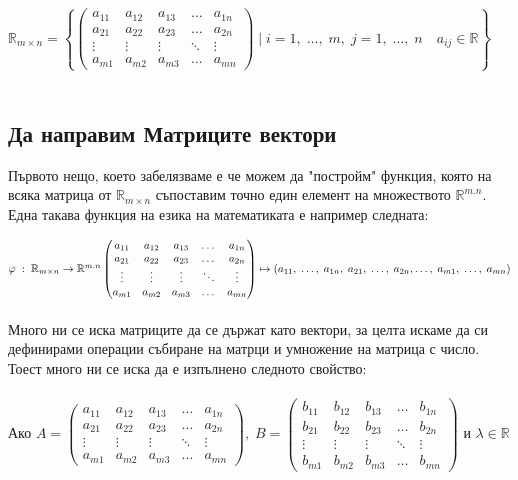 \documentclass[12pt]{article}
\newcommand{\R}{\mathbb{R}}
\begin{document}
$ \R_{m \times n} = \left\{
    \begin{pmatrix}
        a_{11} & a_{12} & a_{13} & \dots  & a_{1n} \\
        a_{21} & a_{22} & a_{23} & \dots  & a_{2n} \\
        \vdots & \vdots & \vdots & \ddots & \vdots \\
        a_{m1} & a_{m2} & a_{m3} & \dots  & a_{mn}
    \end{pmatrix} \; \Bigg| \; i = 1, \; \dots, \; m, \; j = 1, \; \dots, \; n \quad a_{ij} \in \R
\right\} $ \\\\

\subsection*{Да направим Матриците вектори}

Първото нещо, което забелязваме е че можем да "постройм" функция, която на всяка матрица от $\R_{m \times n}$ съпоставим точно един
елемент на множеството $\R^{m.n}$. Една такава функция на езика на математиката е например следната: \pagebreak

$
    \varphi \; : \; \R_{m \times n} \to \R^{m.n} \\\\
    \begin{pmatrix}
        a_{11} & a_{12} & a_{13} & \dots  & a_{1n} \\
        a_{21} & a_{22} & a_{23} & \dots  & a_{2n} \\
        \vdots & \vdots & \vdots & \ddots & \vdots \\
        a_{m1} & a_{m2} & a_{m3} & \dots  & a_{mn}
    \end{pmatrix} \mapsto (a_{11}, \; \dots, \; a_{1n}, \; a_{21}, \; \dots, \; a_{2n}, \dots, \; a_{m1}, \;  \dots, \; a_{mn})
$ \\\\

Много ни се иска матриците да се държат като вектори, за целта искаме да си дефинирами операции събиране на матрци и умножение на матрица с число.
Тоест много ни се иска да е изпълнено следното свойство: \\\\

Ако $A = \begin{pmatrix}
    a_{11} & a_{12} & a_{13} & \dots  & a_{1n} \\
    a_{21} & a_{22} & a_{23} & \dots  & a_{2n} \\
    \vdots & \vdots & \vdots & \ddots & \vdots \\
    a_{m1} & a_{m2} & a_{m3} & \dots  & a_{mn}
\end{pmatrix}, \; B = \begin{pmatrix}
    b_{11} & b_{12} & b_{13} & \dots  & b_{1n} \\
    b_{21} & b_{22} & b_{23} & \dots  & b_{2n} \\
    \vdots & \vdots & \vdots & \ddots & \vdots \\
    b_{m1} & b_{m2} & b_{m3} & \dots  & b_{mn}
\end{pmatrix}$ и $\lambda \in \R$\\\\
\end{document}
